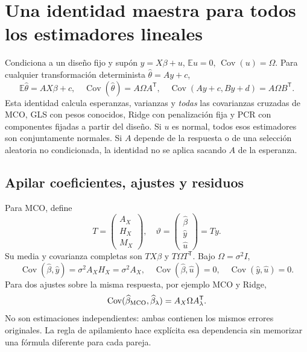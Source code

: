 \documentclass[11pt,a4paper]{article}
\newcommand{\E}{\mathbb E}
\newcommand{\T}{^{\mathsf T}}
\DeclareMathOperator{\Cov}{Cov}
\theoremstyle{definition}
\begin{document}
\section{Una identidad maestra para todos los estimadores lineales}
Condiciona a un diseño fijo y supón $y=X\beta+u$, $\E u=0$, $\Cov(u)=\Omega$. Para cualquier transformación determinista $\widehat\theta=Ay+c$,
\[
\boxed{\E\widehat\theta=AX\beta+c,\quad
\Cov(\widehat\theta)=A\Omega A\T,\quad
\Cov(Ay+c,By+d)=A\Omega B\T}.
\]
Esta identidad calcula esperanzas, varianzas y \emph{todas} las covarianzas cruzadas de MCO, GLS con pesos conocidos, Ridge con penalización fija y PCR con componentes fijadas a partir del diseño. Si $u$ es normal, todos esos estimadores son conjuntamente normales. Si $A$ depende de la respuesta o de una selección aleatoria no condicionada, la identidad no se aplica sacando $A$ de la esperanza.
\subsection{Apilar coeficientes, ajustes y residuos}
Para MCO, define
\[
T=\begin{pmatrix}A_X\\H_X\\M_X\end{pmatrix},\quad
\vartheta=\begin{pmatrix}\widehat\beta\\\widehat y\\\widehat u\end{pmatrix}=Ty.
\]
Su media y covarianza completas son $TX\beta$ y $T\Omega T\T$. Bajo $\Omega=\sigma^2I$,
\[
\Cov(\widehat\beta,\widehat y)=\sigma^2A_XH_X=\sigma^2A_X,
\quad\Cov(\widehat\beta,\widehat u)=0,
\quad\Cov(\widehat y,\widehat u)=0.
\]
Para dos ajustes sobre la misma respuesta, por ejemplo MCO y Ridge,
\[
\Cov(\widehat\beta_{\rm MCO},\widehat\beta_\lambda)=A_X\Omega A_\lambda\T.
\]
No son estimaciones independientes: ambas contienen los mismos errores originales. La regla de apilamiento hace explícita esa dependencia sin memorizar una fórmula diferente para cada pareja.
\end{document}
